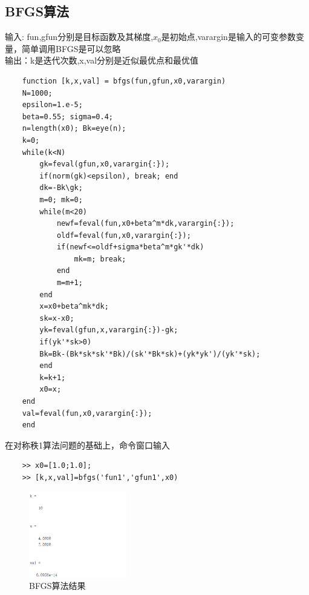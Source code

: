 \documentclass[12pt]{article} %
\begin{document}
	\subsection{BFGS算法}
	\indent 输入: fun,gfun分别是目标函数及其梯度,$x_0$是初始点,varargin是输入的可变参数变量，简单调用BFGS是可以忽略\\
	\indent 输出：k是迭代次数,x,val分别是近似最优点和最优值
	\begin{lstlisting}
	function [k,x,val] = bfgs(fun,gfun,x0,varargin)
	N=1000;
	epsilon=1.e-5;
	beta=0.55; sigma=0.4;
	n=length(x0); Bk=eye(n);
	k=0;
	while(k<N)
		gk=feval(gfun,x0,varargin{:});
		if(norm(gk)<epsilon), break; end 
		dk=-Bk\gk;
		m=0; mk=0;
		while(m<20)
			newf=feval(fun,x0+beta^m*dk,varargin{:});
			oldf=feval(fun,x0,varargin{:});
			if(newf<=oldf+sigma*beta^m*gk'*dk)
				mk=m; break;
			end
			m=m+1;
		end
		x=x0+beta^mk*dk;
		sk=x-x0;
		yk=feval(gfun,x,varargin{:})-gk;
		if(yk'*sk>0)
		Bk=Bk-(Bk*sk*sk'*Bk)/(sk'*Bk*sk)+(yk*yk')/(yk'*sk);
		end
		k=k+1;
		x0=x;
	end
	val=feval(fun,x0,varargin{:});
	end
	\end{lstlisting}
	\indent 在对称秩1算法问题的基础上，命令窗口输入
	\begin{lstlisting}
	>> x0=[1.0;1.0];
	>> [k,x,val]=bfgs('fun1','gfun1',x0)
	\end{lstlisting}
		\begin{figure}[ht]
		\centering
		\includegraphics[width=0.38\textwidth]{bfgs.png}
		\caption{BFGS算法结果}
		\label{fig:fig1}
	\end{figure}
\end{document}

